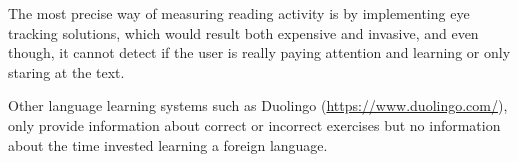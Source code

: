The most precise way of measuring reading activity is by implementing eye tracking solutions, which would result both expensive and invasive, and even though, it cannot detect if the user is really paying attention and learning or only staring at the text.

Other language learning systems such as Duolingo (\url{https://www.duolingo.com/}), only provide information about correct or incorrect exercises but no information about the time invested learning a foreign language.
